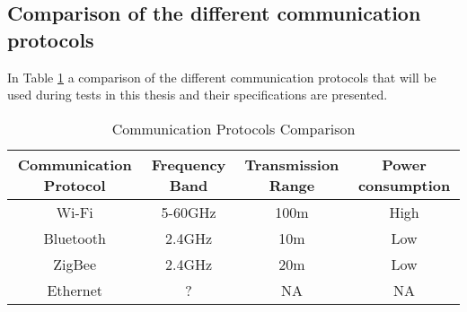 \subsection*{Comparison of the different communication protocols}
In Table \ref{CommunicationProtocolsComparison} a comparison of the different communication protocols that will be used during tests in this thesis and their specifications are presented. \\
\begin{table}[!hbtp]
\begin{tabular}{||c | c | c | c ||} 
 \hline
 Communication Protocol & Frequency Band & Transmission Range  & Power consumption\\ [0.5ex]
 \hline\hline
 Wi-Fi & 5-60GHz & 100m & High\\ 
 Bluetooth & 2.4GHz & 10m & Low\\
 ZigBee & 2.4GHz & 20m & Low \\
 Ethernet & ? & NA & NA\\ [1ex] 
 \hline
\end{tabular}
\caption{Communication Protocols Comparison}
\label{CommunicationProtocolsComparison}
\end{table}